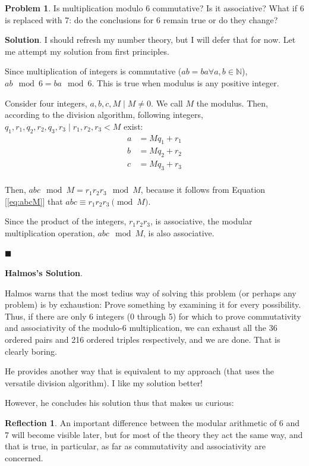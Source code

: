 \documentclass[english,notitlepage,smartquotes]{hgbreport}
\theoremstyle{definition}
\theoremstyle{definition}
\newtheorem{problem}{Problem}
\theoremstyle{remark}
\theoremstyle{definition}
\theoremstyle{plain}
\renewcommand\qedsymbol{$\blacksquare$}
\theoremstyle{definition}
\newtheorem{reflection}{Reflection}
\begin{document}
\begin{problem}
\label{pr:modularmult}
Is multiplication modulo 6 commutative? Is it associative? What if 6 is replaced with 7: do the conclusions for 6 remain true or do they change?
\end{problem}

\textbf{Solution}.
I should refresh my number theory, but I will defer that for now. Let me attempt my solution from first principles.

Since multiplication of integers is commutative ($ab=ba \forall a,b\in\mathbb{N}$), $ab\mod 6=ba\mod 6$. This is true when modulus is any positive integer.

Consider four integers, $a,b,c,M\mid M\ne 0$. We call $M$ the modulus. Then, according to the division algorithm, following integers, $q_1,r_1,q_2,r_2,q_3,r_3\mid r_1,r_2,r_3<M$ exist:
\begin{equation}
\!
\begin{aligned}
a &= Mq_1+r_1\\
b &= Mq_2+r_2\\
c &= Mq_3+r_3\\
\end{aligned}\label{eq:abcM}
\end{equation}

Then, $abc\mod M=r_1r_2r_3\mod M$, because it follows from Equation [\ref{eq:abcM}] that $abc\equiv r_1r_2r_3 \pmod{M}$.

Since the product of the integers, $r_1r_2r_3$, is associative, the modular multiplication operation, $abc\mod M$, is also associative.

\qedsymbol

\textbf{Halmos's Solution}.

Halmos warns that the most tedius way of solving this problem (or perhaps any problem) is by exhaustion: Prove something by examining it for every possibility. Thus, if there are only 6 integers (0 through 5) for which to prove commutativity and associativity of the modulo-6 multiplication, we can exhaust all the 36 ordered pairs and 216 ordered triples respectively, and we are done. That is clearly boring.

He provides another way that is equivalent to my approach (that uses the versatile division algorithm). I like my solution better!

However, he concludes his solution thus that makes us curious:
\begin{reflection}
An important difference between the modular arithmetic of 6 and 7 will
become visible later, but for most of the theory they act the same way, and that
is true, in particular, as far as commutativity and associativity are concerned.
\end{reflection}
\end{document}
